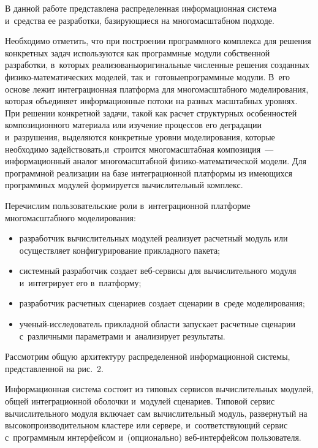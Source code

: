 \begin{multicols}{2}
   В данной работе пред\-став\-ле\-на распределенная информационная система 
   и~средства ее разработки, базирующиеся на многомасштабном подходе. 
   
   Необходимо отметить, что при построении программного комплекса для 
решения конкретных задач используются как программные модули собственной 
разработки, в~которых реализованы\linebreak оригинальные численные решения созданных 
фи\-зи\-ко-ма\-те\-ма\-ти\-че\-ских моделей, так и~готовые\linebreak про\-грам\-мные модули. В~его 
основе лежит интеграционная платформа для многомасштабного моделирования, 
которая объединяет информационные потоки на разных масштабных уровнях. 
При решении конкретной задачи, такой как расчет структурных особенностей 
композиционного материала или изучение процессов его деградации 
и~\mbox{разрушения}, выделяются конкретные уровни моделирования, которые 
необходимо задействовать,\linebreak и~строится многомасштабная композиция~--- 
информационный аналог многомасштабной фи\-зи\-ко-ма\-те\-ма\-ти\-че\-ской 
модели. Для про\-грам\-мной реализации на базе интеграционной платформы из\linebreak 
имеющихся про\-грам\-мных модулей формируется вычислительный комплекс.


   
   Перечислим пользовательские роли в~интеграционной платформе 
многомасштабного моделирования:
   \begin{itemize}
\item разработчик вычислительных модулей реализует расчетный модуль 
или осуществляет конфигурирование прикладного пакета;
\item системный разработчик создает веб-сер\-ви\-сы для вычислительного 
модуля и~интегрирует его в~платформу;
\item разработчик расчетных сценариев создает сценарии в~среде 
моделирования;
\item ученый-исследователь прикладной области запускает расчетные 
сценарии с~различными параметрами и~анализирует результаты.
\end{itemize}

      Рассмотрим общую архитектуру распределенной информационной 
системы, пред\-став\-лен\-ной на рис.~2.



Информационная система состоит из типовых сервисов вычислительных модулей, 
общей интеграционной оболочки и~модулей сценариев. Типовой сервис 
вычислительного модуля включает сам вычислительный модуль, развернутый на 
высокопроизводительном кластере или сервере, и~соответствующий сервис 
с~программным интерфейсом и~(опционально) веб-интерфейсом пользователя.


\end{multicols}

